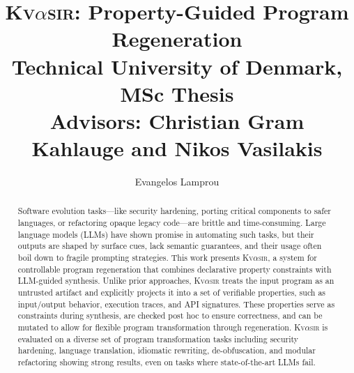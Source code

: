 \documentclass[nonacm,sigplan,review]{acmart}
\newcommand{\sys}{{\scshape Kv{$\alpha$}sir}\xspace}
\begin{document}
\title[Property-Guided Program Regeneration]{\sys: Property-Guided Program Regeneration\\{\vspace{1em}\large Technical University of Denmark, MSc Thesis {\\\vspace{-1em}} Advisors: Christian Gram Kahlauge and Nikos Vasilakis}}
\author{Evangelos Lamprou}



\begin{abstract}
  Software evolution tasks---like security hardening, porting critical components to safer 
  languages, or refactoring opaque legacy code---are brittle and time-consuming.
  Large language models (LLMs) have shown promise in automating such tasks,
  but their outputs are shaped by surface cues, lack
  semantic guarantees, and their usage often boil down to fragile prompting strategies.
This work presents \sys, a system for controllable program regeneration that
  combines declarative property constraints with LLM-guided synthesis. Unlike
  prior approaches, \sys treats the input program as an untrusted artifact and
  explicitly projects it into a set of verifiable properties, such as
  input/output behavior, execution traces, and API signatures. These properties
  serve as constraints during synthesis, are checked post hoc to ensure
  correctness, and can be mutated to allow for flexible program transformation through regeneration.
\sys is evaluated on a diverse set of program transformation tasks
including security hardening, language translation, idiomatic rewriting, de-obfuscation,
and modular refactoring showing strong results, even on tasks where state-of-the-art LLMs fail.
\end{abstract}
\maketitle
\end{document}
